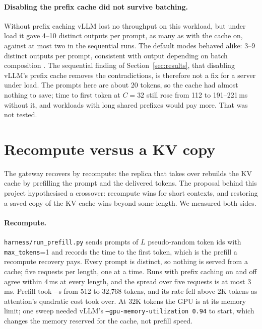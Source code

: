 \documentclass[10pt,twocolumn]{article}
\begin{document}
\paragraph{Disabling the prefix cache did not survive batching.} Without
prefix caching vLLM lost no throughput on this workload, but under load it
gave 4--10 distinct outputs per prompt, as many as with the cache on, against
at most two in the sequential runs. The default modes behaved alike: 3--9
distinct outputs per prompt, consistent with output depending on batch
composition \cite{he2025nondeterminism}. The sequential finding of
Section~\ref{sec:results}, that disabling vLLM's prefix cache removes the
contradictions, is therefore not a fix for a server under load. The prompts
here are about 20 tokens, so the cache had almost nothing to save; time to
first token at $C{=}32$ still rose from 112 to 191--221\,ms without it, and
workloads with long shared prefixes would pay more. That was not tested.

\section{Recompute versus a KV copy}
\label{sec:restore}

The gateway recovers by recompute: the replica that takes over rebuilds the KV
cache by prefilling the prompt and the delivered tokens. The proposal behind
this project hypothesised a crossover: recompute wins for short contexts, and
restoring a saved copy of the KV cache wins beyond some length. We measured
both sides.

\paragraph{Recompute.} \texttt{harness/run\_prefill.py} sends prompts of $L$
pseudo-random token ids with \texttt{max\_tokens}=1 and records the time to
the first token, which is the prefill a recompute recovery pays. Every prompt
is distinct, so nothing is served from a cache; five requests per length, one
at a time. Runs with prefix caching on and off agree within 4\,ms at every
length, and the spread over five requests is at most 3\,ms. Prefill took
\RecompMin--\RecompMax\,s from 512 to 32{,}768 tokens, and its rate fell
above 2K tokens as attention's quadratic cost took over. At 32K tokens the
GPU is at its memory limit; one sweep needed vLLM's
\texttt{--gpu-memory-utilization 0.94} to start, which changes the memory
reserved for the cache, not prefill speed.
\end{document}
